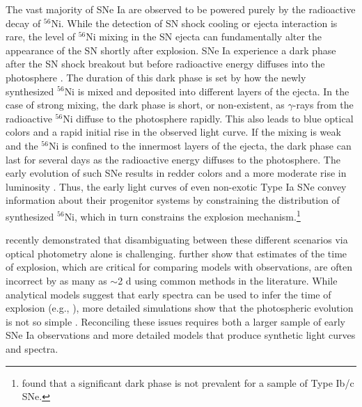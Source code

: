 \documentclass[twocolumn]{aastex61}
\begin{document}
The vast majority of SNe Ia are observed 
to be powered purely by the radioactive decay of $^{56}$Ni. 
While the detection of SN shock cooling or ejecta interaction is rare, the level of $^{56}$Ni mixing in the SN ejecta can fundamentally alter the appearance of the SN shortly after explosion. SNe Ia experience a dark phase after
the SN shock breakout but before radioactive energy  
diffuses into the photosphere \citep{2014ApJ...784...85P}. The 
duration of this dark phase is set by how the newly synthesized 
$^{56}$Ni is mixed and deposited into different layers of the ejecta. In the case of strong mixing, the dark phase is short, or 
non-existent, as $\gamma$-rays from the radioactive $^{56}$Ni diffuse to the photosphere rapidly. This also leads to blue optical colors and a rapid initial rise in the observed light curve. If the mixing is weak and the $^{56}$Ni is confined to the innermost layers of the ejecta, the dark phase can last for several days as the radioactive energy diffuses to the photosphere. The early evolution of such SNe results in redder colors and a more moderate rise in luminosity \citep{2016ApJ...826...96P}. Thus, the early light curves of even non-exotic Type Ia SNe convey information about their progenitor systems by constraining the distribution of synthesized $^{56}$Ni, which in turn constrains the explosion mechanism.\footnote{\citet{2015A&A...574A..60T} found that a significant dark phase is not prevalent for a sample of Type Ib/c SNe.}

\citet{2017arXiv170603613N} recently demonstrated that disambiguating between these different scenarios via optical photometry alone is challenging. \citeauthor{2017arXiv170603613N} further show that estimates of the time of explosion, which are critical for comparing models with observations, are often incorrect by as many as $\sim$2 d using common methods in the literature. While analytical models suggest that early spectra can be used to infer the time of explosion (e.g., \citealt{2014ApJ...784...85P}), more detailed simulations show that the photospheric evolution is not so simple \citep{2016ApJ...826...96P}. Reconciling these issues requires both a larger sample of early SNe Ia observations and more detailed models that produce synthetic light curves and spectra.
\end{document}
